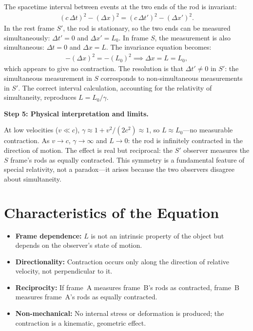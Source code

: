 The spacetime interval between events at the two ends of the rod is invariant:
\begin{align}
(c\,\Delta t)^2 - (\Delta x)^2 = (c\,\Delta t')^2 - (\Delta x')^2.
\end{align}
In the rest frame $S'$, the rod is stationary, so the two ends can be measured simultaneously: $\Delta t' = 0$ and $\Delta x' = L_0$. In frame $S$, the measurement is also simultaneous: $\Delta t = 0$ and $\Delta x = L$. The invariance equation becomes:
\begin{align}
-(\Delta x)^2 = -(L_0)^2 \implies \Delta x = L = L_0,
\end{align}
which appears to give no contraction. The resolution is that $\Delta t' \neq 0$ in $S'$: the simultaneous measurement in $S$ corresponds to non-simultaneous measurements in $S'$. The correct interval calculation, accounting for the relativity of simultaneity, reproduces $L = L_0/\gamma$.

\textbf{Step 5: Physical interpretation and limits.}

At low velocities ($v \ll c$), $\gamma \approx 1 + v^2/(2c^2) \approx 1$, so $L \approx L_0$---no measurable contraction. As $v \to c$, $\gamma \to \infty$ and $L \to 0$: the rod is infinitely contracted in the direction of motion. The effect is real but reciprocal: the $S'$ observer measures the $S$ frame's rods as equally contracted. This symmetry is a fundamental feature of special relativity, not a paradox---it arises because the two observers disagree about simultaneity.

\section*{Characteristics of the Equation}

\begin{itemize}
  \item \textbf{Frame dependence:} $L$ is not an intrinsic property of the object but depends on the observer's state of motion.
  \item \textbf{Directionality:} Contraction occurs only along the direction of relative velocity, not perpendicular to it.
  \item \textbf{Reciprocity:} If frame~A measures frame~B's rods as contracted, frame~B measures frame~A's rods as equally contracted.
  \item \textbf{Non-mechanical:} No internal stress or deformation is produced; the contraction is a kinematic, geometric effect.
\end{itemize}
